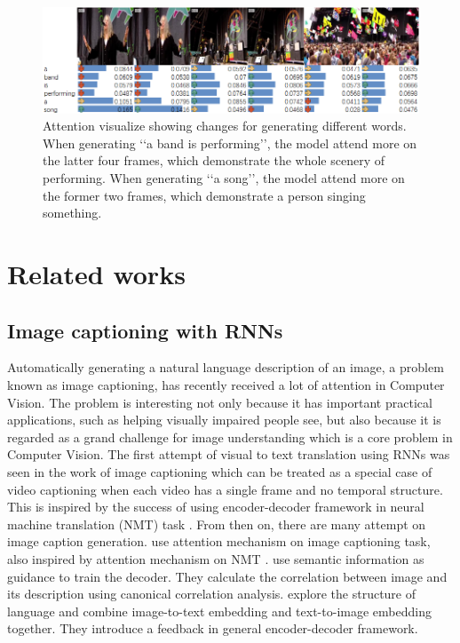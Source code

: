 \begin{figure}[htbp]
\centering
\includegraphics[width=14cm]{resources/att3.png}
\caption{Attention visualize showing changes for generating different words. When generating \lq{}\lq{}a band is performing\rq{}\rq{}, the model attend more on the latter four frames, which demonstrate the whole scenery of performing. When generating \lq{}\lq{}a song\rq{}\rq{}, the model attend more on the former two frames, which demonstrate a person singing something.}
\label{fig:att3}
\end{figure}

\section{Related works}
\subsection{Image captioning with RNNs}
Automatically generating a natural language description of an image, a problem known as image captioning, has recently received a lot of attention in Computer Vision. The problem is interesting not only because it has important practical applications, such as helping visually impaired people see, but also because it is regarded as a grand challenge for image understanding which is a core problem in Computer Vision. The first attempt of visual to text translation using RNNs was seen in the work of image captioning \cite{Mao2014Deep,Vinyals2015Show} which can be treated as a special case of video captioning when each video has a single frame and no temporal structure. This is inspired by the success of using encoder-decoder framework in neural machine translation (NMT) task \cite{cho2014learning}. From then on, there are many attempt on image caption generation. \cite{xu2015show} use attention mechanism on image captioning task, also inspired by attention mechanism on NMT \cite{bahdanau2014neural}. \cite{Jia2015Guiding} use semantic information as guidance to train the decoder. They calculate the correlation between image and its description using canonical correlation analysis. \cite{You2016Image} explore the structure of language and combine image-to-text embedding and text-to-image embedding together. They introduce a feedback in general encoder-decoder framework.

